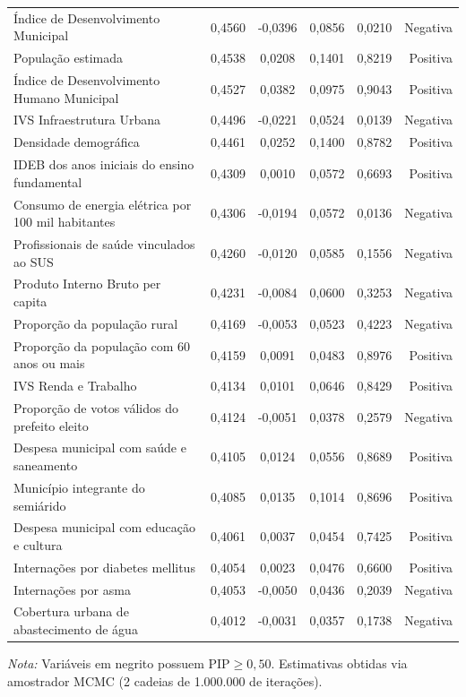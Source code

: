 \begin{table}[htbp]
\begin{tabular}{lccccr}
Índice de Desenvolvimento Municipal & 0,4560 & -0,0396 & 0,0856 & 0,0210 & Negativa \\
População estimada & 0,4538 & 0,0208 & 0,1401 & 0,8219 & Positiva \\
Índice de Desenvolvimento Humano Municipal & 0,4527 & 0,0382 & 0,0975 & 0,9043 & Positiva \\
IVS Infraestrutura Urbana & 0,4496 & -0,0221 & 0,0524 & 0,0139 & Negativa \\
Densidade demográfica & 0,4461 & 0,0252 & 0,1400 & 0,8782 & Positiva \\
IDEB dos anos iniciais do ensino fundamental & 0,4309 & 0,0010 & 0,0572 & 0,6693 & Positiva \\
Consumo de energia elétrica por 100 mil habitantes & 0,4306 & -0,0194 & 0,0572 & 0,0136 & Negativa \\
Profissionais de saúde vinculados ao SUS & 0,4260 & -0,0120 & 0,0585 & 0,1556 & Negativa \\
Produto Interno Bruto per capita & 0,4231 & -0,0084 & 0,0600 & 0,3253 & Negativa \\
Proporção da população rural & 0,4169 & -0,0053 & 0,0523 & 0,4223 & Negativa \\
Proporção da população com 60 anos ou mais & 0,4159 & 0,0091 & 0,0483 & 0,8976 & Positiva \\
IVS Renda e Trabalho & 0,4134 & 0,0101 & 0,0646 & 0,8429 & Positiva \\
Proporção de votos válidos do prefeito eleito & 0,4124 & -0,0051 & 0,0378 & 0,2579 & Negativa \\
Despesa municipal com saúde e saneamento & 0,4105 & 0,0124 & 0,0556 & 0,8689 & Positiva \\
Município integrante do semiárido & 0,4085 & 0,0135 & 0,1014 & 0,8696 & Positiva \\
Despesa municipal com educação e cultura & 0,4061 & 0,0037 & 0,0454 & 0,7425 & Positiva \\
Internações por diabetes mellitus & 0,4054 & 0,0023 & 0,0476 & 0,6600 & Positiva \\
Internações por asma & 0,4053 & -0,0050 & 0,0436 & 0,2039 & Negativa \\
Cobertura urbana de abastecimento de água & 0,4012 & -0,0031 & 0,0357 & 0,1738 & Negativa \\
\bottomrule
\end{tabular}
\begin{tablenotes}\footnotesize
\item \textit{Nota:} Variáveis em negrito possuem $\text{PIP} \ge 0{,}50$. Estimativas obtidas via amostrador MCMC (2 cadeias de 1.000.000 de iterações).
\end{tablenotes}
\end{table}